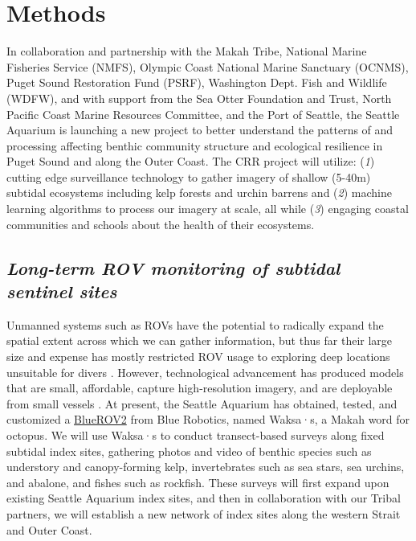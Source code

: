 \documentclass[11pt]{article}
\begin{document}
\section{Methods}
\label{Methods}
In collaboration and partnership with
the Makah Tribe, 
National Marine Fisheries Service (NMFS), 
Olympic Coast National Marine Sanctuary (OCNMS),
Puget Sound Restoration Fund (PSRF),
Washington Dept. Fish and Wildlife (WDFW),
and with support from the 
Sea Otter Foundation and Trust,
North Pacific Coast Marine Resources Committee, and 
the Port of Seattle,
the Seattle Aquarium is launching a new project to better understand the patterns of and processing affecting benthic community structure and ecological resilience in Puget Sound and along the Outer Coast. 
%
The CRR project will utilize: 
(\textit{1}) cutting edge surveillance technology to gather imagery of 
shallow (5-40m) subtidal ecosystems including kelp forests and urchin 
barrens 
and  
(\textit{2}) machine learning algorithms to process our imagery at scale, all while 
(\textit{3}) engaging coastal communities and schools about the health of their ecosystems. 
%

\subsection{\textit{Long-term ROV monitoring of subtidal sentinel 
sites}}
Unmanned systems such as ROVs have the potential to radically expand 
the spatial extent across which we can gather information, but thus far 
their large size and expense has mostly restricted ROV usage to 
exploring deep locations unsuitable for divers \cite{Hamel2020}.
However, technological advancement has produced models that are small, 
affordable, capture high-resolution imagery, and are deployable from 
small vessels \cite{Buscher2020}. 
At present, the Seattle Aquarium has obtained, tested, and customized a 
\href{https://bluerobotics.com/}{BlueROV2} from Blue Robotics, named 
Waksa·s, a Makah word for octopus. 
We will use Waksa·s to conduct transect-based surveys along fixed 
subtidal index sites, gathering photos and video of benthic species 
such as understory and canopy-forming kelp, invertebrates such as sea 
stars, sea urchins, and abalone, and fishes such as rockfish. 
These surveys will first expand upon existing Seattle Aquarium index 
sites, and then in collaboration with our Tribal partners, we will 
establish a new network of index sites along the western Strait and 
Outer Coast. 
\end{document}
